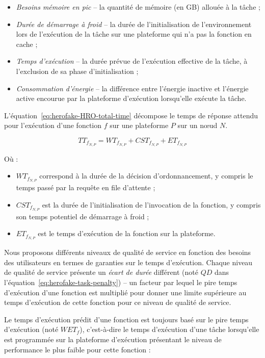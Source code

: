 \begin{itemize}
    \item \textit{Besoins mémoire en pic} -- la quantité de mémoire (en GB) allouée à la tâche ;
    \item \textit{Durée de démarrage à froid} -- la durée de l'initialisation de l'environnement lors de l'exécution de la tâche sur une plateforme qui n'a pas la fonction en cache ;
    \item \textit{Temps d'exécution} -- la durée prévue de l'exécution effective de la tâche, à l'exclusion de sa phase d'initialisation ;
    \item \textit{Consommation d'énergie} -- la différence entre l'énergie inactive et l'énergie active encourue par la plateforme d'exécution lorsqu'elle exécute la tâche.
\end{itemize}

L'équation~\ref{eq:herofake-HRO-total-time} décompose le temps de réponse attendu pour l'exécution d'une fonction $f$ sur une plateforme $P$ sur un nœud $N$.

\begin{equation}
    {TT}_{{f}_{N, P}} = {WT}_{{f}_{N, P}} + {CST}_{{f}_{N, P}} + {ET}_{{f}_{N, P}}
\label{eq:herofake-HRO-total-time}
\end{equation}

Où :

\begin{itemize}
    \item ${WT}_{{f}_{N, P}}$ correspond à la durée de la décision d'ordonnancement, y compris le temps passé par la requête en file d'attente ;
    \item ${CST}_{{f}_{N, P}}$ est la durée de l'initialisation de l'invocation de la fonction, y compris son temps potentiel de démarrage à froid ;
    \item ${ET}_{{f}_{N, P}}$ est le temps d'exécution de la fonction sur la plateforme.
\end{itemize}

Nous proposons différents niveaux de qualité de service en fonction des besoins des utilisateurs en termes de garanties sur le temps d'exécution. Chaque niveau de qualité de service présente un \textit{écart de durée} différent (noté $QD$ dans l'équation~\ref{eq:herofake-task-penalty}) -- un facteur par lequel le pire temps d'exécution d'une fonction est multiplié pour donner une limite supérieure au temps d'exécution de cette fonction pour ce niveau de qualité de service.

Le temps d'exécution prédit d'une fonction est toujours basé sur le pire temps d'exécution (noté $WET_{f}$), c'est-à-dire le temps d'exécution d'une tâche lorsqu'elle est programmée sur la plateforme d'exécution présentant le niveau de performance le plus faible pour cette fonction :


